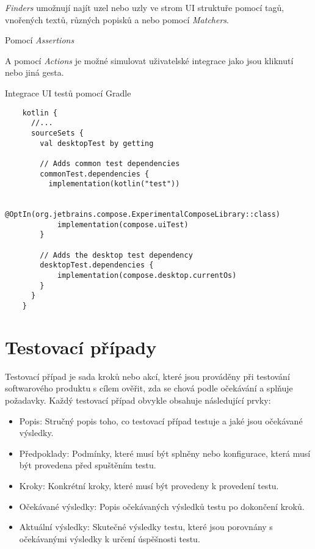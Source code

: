 \textit{Finders} umožnují najít uzel nebo uzly ve strom UI struktuře pomocí tagů, vnořených textů, různých popisků a nebo pomocí \textit{Matchers}.


Pomocí \textit{Assertions}

A pomocí \textit{Actions} je možné simulovat uživatelské integrace jako jsou kliknutí nebo jiná gesta. \cite{composeTesting}



\begin{listing}[H]
  \caption{Integrace UI testů pomocí Gradle}\label{lst:testsIntegration}
  \begin{verbatim}
    kotlin {
      //...
      sourceSets {
        val desktopTest by getting
    
        // Adds common test dependencies
        commonTest.dependencies {
          implementation(kotlin("test"))
    
            @OptIn(org.jetbrains.compose.ExperimentalComposeLibrary::class)
            implementation(compose.uiTest)
        }
    
        // Adds the desktop test dependency
        desktopTest.dependencies {
            implementation(compose.desktop.currentOs)
        }
      }
    }
\end{verbatim}
\end{listing}

\section{Testovací případy}
Testovací případ je sada kroků nebo akcí, které jsou prováděny při testování softwarového produktu s cílem ověřit, zda se chová podle očekávání a splňuje 
požadavky. Každý testovací případ obvykle obsahuje následující prvky:

\begin{itemize}
  \item Popis: Stručný popis toho, co testovací případ testuje a jaké jsou očekávané výsledky.
  \item Předpoklady: Podmínky, které musí být splněny nebo konfigurace, která musí být provedena před spuštěním testu.
  \item Kroky: Konkrétní kroky, které musí být provedeny k provedení testu.
  \item Očekávané výsledky: Popis očekávaných výsledků testu po dokončení kroků.
  \item Aktuální výsledky: Skutečné výsledky testu, které jsou porovnány s očekávanými výsledky k určení úspěšnosti testu.
\end{itemize}


